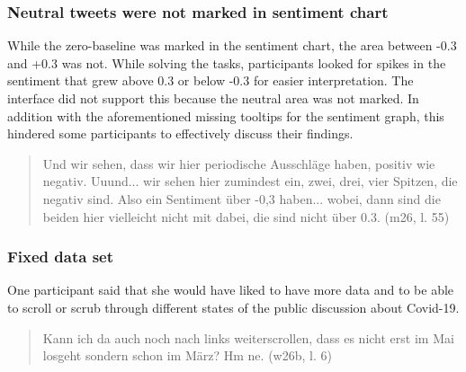\subsubsection*{Neutral tweets were not marked in sentiment chart}
While the zero-baseline was marked in the sentiment chart, the area between -0.3 and +0.3 was not. While solving the tasks, participants looked for spikes in the sentiment that grew above 0.3 or below -0.3 for easier interpretation. The interface did not support this because the neutral area was not marked. In addition with the aforementioned missing tooltips for the sentiment graph, this hindered some participants to effectively discuss their findings.

\begin{quote}
    Und wir sehen, dass wir hier periodische Ausschläge haben, positiv wie negativ. Uuund... wir sehen hier zumindest ein, zwei, drei, vier Spitzen, die negativ sind. Also ein Sentiment über -0,3 haben... wobei, dann sind die beiden hier vielleicht nicht mit dabei, die sind nicht über 0.3. (m26, l. 55)
\end{quote}

\subsubsection*{Fixed data set}
One participant said that she would have liked to have more data and to be able to scroll or scrub through different states of the public discussion about Covid-19.

\begin{quote}
    Kann ich da auch noch nach links weiterscrollen, dass es nicht erst im Mai losgeht sondern schon im März? Hm ne. (w26b, l. 6)
\end{quote}
